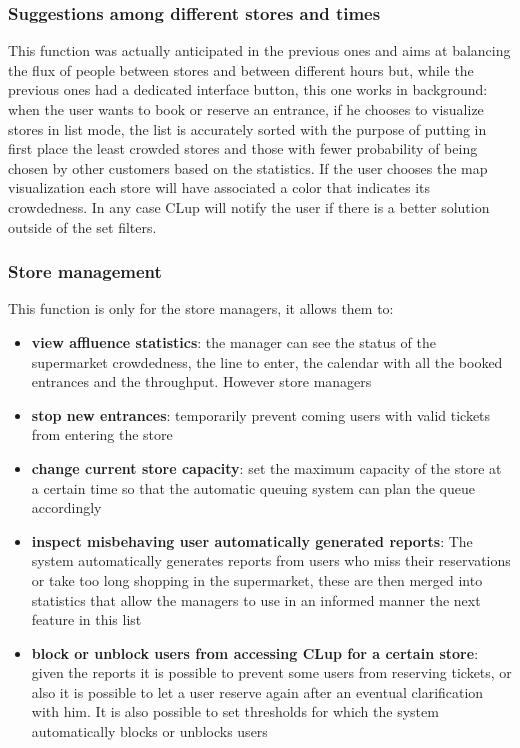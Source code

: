 \subsubsection{\sffamily Suggestions among different stores and times}
This function was actually anticipated in the previous ones and aims at balancing the flux of people between stores and between different hours but, while the previous ones had a dedicated interface button, this one works in background: when the user wants to book or reserve an entrance, if he chooses to visualize stores in list mode, the list is accurately sorted with the purpose of putting in first place the least crowded stores and those with fewer probability of being chosen by other customers based on the statistics. If the user chooses the map visualization each store will have associated a color that indicates its crowdedness. In any case CLup will notify the user if there is a better solution outside of the set filters. 

\subsubsection{\sffamily Store management} 
This function is only for the store managers, it allows them to:
\begin{itemize}
	\item
	\textbf{view affluence statistics}: the manager can see the status of the supermarket crowdedness, the line to enter, the calendar with all the booked entrances and the throughput. However store managers
	\item
	\textbf{stop new entrances}: temporarily prevent coming users with valid tickets from entering the store
	\item
	\textbf{change current store capacity}: set the maximum capacity of the store at a certain time so that the automatic queuing system can plan the queue accordingly
	\item
	\textbf{inspect misbehaving user automatically generated reports}: The system automatically generates reports from users who miss their reservations or take too long shopping in the supermarket, these are then merged into statistics that allow the managers to use in an informed manner the next feature in this list
	\item 
	\textbf{block or unblock users from accessing CLup for a certain store}: given the reports it is possible to prevent some users from reserving tickets, or also it is possible to let a user reserve again after an eventual clarification with him. It is also possible to set thresholds for which the system automatically blocks or unblocks users
\end{itemize}


